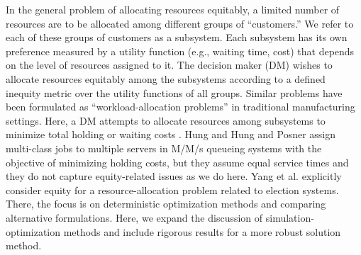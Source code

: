 In the general problem of allocating resources equitably, a limited number of resources are to be allocated among different groups of “customers.” We refer to each of these groups of customers as a subsystem. Each subsystem has its own preference measured by a utility function (e.g., waiting time, cost) that depends on the level of resources assigned to it. The decision maker (DM) wishes to allocate resources equitably among the subsystems according to a defined inequity metric over the utility functions of all groups. Similar problems have been formulated as “workload-allocation problems” in traditional manufacturing settings. Here, a DM attempts to allocate resources among subsystems to minimize total holding or waiting costs \cite{fox1966discrete, rolfe1971note, dyer1977note}. Hung \cite{hung2006allocation} and Hung and Posner \cite{hung2007allocation} assign multi-class jobs to multiple servers in M/M/s queueing systems with the objective of minimizing holding costs, but they assume equal service times and they do not capture equity-related issues as we do here. Yang et al. \cite{yang2014improving} explicitly consider equity for a resource-allocation problem related to election systems. There, the focus is on deterministic optimization methods and comparing alternative formulations. Here, we expand the discussion of simulation-optimization methods and include rigorous results for a more robust solution method.
